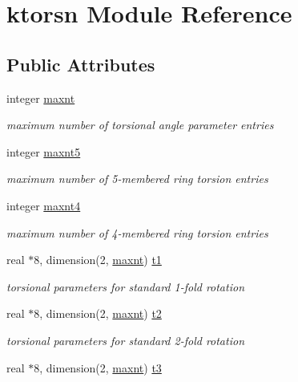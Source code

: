 \hypertarget{classktorsn}{\section{ktorsn Module Reference}
\label{classktorsn}
}
\subsection*{Public Attributes}
\begin{DoxyCompactItemize}
\item 
integer \hyperlink{classktorsn_a24826636e5e70f0f36f28baf53af9ceb}{maxnt}
\begin{DoxyCompactList}\small\item\em maximum number of torsional angle parameter entries \end{DoxyCompactList}\item 
integer \hyperlink{classktorsn_a0391ba344c3a8a876ef6d3853b8e1a10}{maxnt5}
\begin{DoxyCompactList}\small\item\em maximum number of 5-\/membered ring torsion entries \end{DoxyCompactList}\item 
integer \hyperlink{classktorsn_a5a45df497069015a810999bb1fab9abe}{maxnt4}
\begin{DoxyCompactList}\small\item\em maximum number of 4-\/membered ring torsion entries \end{DoxyCompactList}\item 
real $\ast$8, dimension(2, \hyperlink{classktorsn_a24826636e5e70f0f36f28baf53af9ceb}{maxnt}) \hyperlink{classktorsn_a8cdbc5eef61129c393c4fecf38548baa}{t1}
\begin{DoxyCompactList}\small\item\em torsional parameters for standard 1-\/fold rotation \end{DoxyCompactList}\item 
real $\ast$8, dimension(2, \hyperlink{classktorsn_a24826636e5e70f0f36f28baf53af9ceb}{maxnt}) \hyperlink{classktorsn_a0aea1c3f271817692625a530f10a55f6}{t2}
\begin{DoxyCompactList}\small\item\em torsional parameters for standard 2-\/fold rotation \end{DoxyCompactList}\item 
real $\ast$8, dimension(2, \hyperlink{classktorsn_a24826636e5e70f0f36f28baf53af9ceb}{maxnt}) \hyperlink{classktorsn_a5c5d25c1cf83ab9ec82ec366e050c4aa}{t3}

\end{DoxyCompactItemize}
